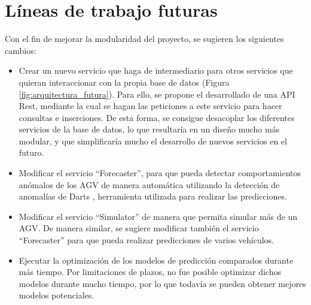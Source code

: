 \section{Líneas de trabajo futuras}


Con el fin de mejorar la modularidad del proyecto, se sugieren los siguientes cambios:
\begin{itemize}
    \item Crear un nuevo servicio que haga de intermediario para otros servicios que quieran interaccionar con la propia base de datos 
        (Figura \ref{fig:arquitectura_futura}). Para ello, se propone el desarrollado de una API Rest, mediante la cual 
        se hagan las peticiones a este servicio para hacer consultas e inserciones. De esta forma, se consigue 
        desacoplar los diferentes servicios de la base de datos, lo que resultaría en un diseño mucho más modular, y 
        que simplificaría mucho el desarrollo de nuevos servicios en el futuro.
    \item Modificar el servicio ``Forecaster'', para que pueda detectar comportamientos anómalos de los AGV de manera 
        automática utilizando la detección de anomalías de Darts \cite{darts:anomaly}, herramienta utilizada para realizar las predicciones.
    \item Modificar el servicio ``Simulator'' de manera que permita simular más de un AGV. De manera similar, se sugiere 
        modificar también el servicio ``Forecaster'' para que pueda realizar predicciones de varios vehículos.
    \item Ejecutar la optimización de los modelos de predicción comparados durante más tiempo. Por limitaciones 
        de plazos, no fue posible optimizar dichos modelos durante mucho tiempo, por lo que todavía se pueden obtener 
        mejores modelos potenciales.
\end{itemize}

